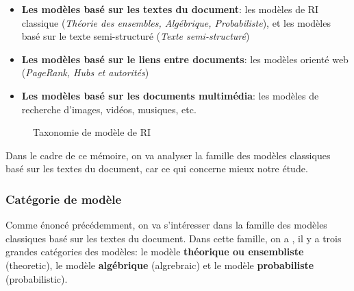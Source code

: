 \begin{itemize}
    \item \textbf{Les modèles basé sur les textes du document}: les modèles de RI classique (\textit{Théorie des ensembles, Algébrique, Probabiliste}), et les modèles basé sur le texte semi-structuré (\textit{Texte semi-structuré})
    \item \textbf{Les modèles basé sur le liens entre documents}: les modèles orienté web (\textit{PageRank, Hubs et autorités})
    \item \textbf{Les modèles basé sur les documents multimédia}: les modèles de recherche d'images, vidéos, musiques, etc.
\end{itemize}

\begin{figure}[htbp]
    \begin{center}
    \end{center}
    \caption{Taxonomie de modèle de RI \citep{soulier2014:def-evaluation-modele}}
    \label{fig:modele-ri}
\end{figure}

Dans le cadre de ce mémoire, on va analyser la famille des modèles classiques basé sur les textes du document, car ce qui concerne mieux notre étude.

\subsubsection{Catégorie de modèle}
Comme énoncé précédemment, on va s’intéresser dans la famille des modèles classiques basé sur les textes du document. Dans cette famille, on a \citep*{modern-ir, approche-semantique,soulier2014:def-evaluation-modele}, il y a trois grandes catégories des modèles: le modèle \textbf{théorique ou ensembliste} (theoretic), le modèle \textbf{algébrique} (algrebraic) et le modèle \textbf{probabiliste} (probabilistic).

